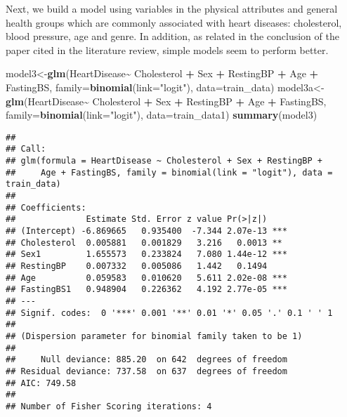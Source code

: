 \documentclass[
]{article}
\newenvironment{Shaded}{\begin{snugshade}}{\end{snugshade}}
\newcommand{\AttributeTok}[1]{\textcolor[rgb]{0.13,0.29,0.53}{#1}}
\newcommand{\FunctionTok}[1]{\textcolor[rgb]{0.13,0.29,0.53}{\textbf{#1}}}
\newcommand{\NormalTok}[1]{#1}
\newcommand{\OtherTok}[1]{\textcolor[rgb]{0.56,0.35,0.01}{#1}}
\newcommand{\SpecialCharTok}[1]{\textcolor[rgb]{0.81,0.36,0.00}{\textbf{#1}}}
\newcommand{\StringTok}[1]{\textcolor[rgb]{0.31,0.60,0.02}{#1}}
\begin{document}
Next, we build a model using variables in the physical attributes and
general health groups which are commonly associated with heart diseases:
cholesterol, blood pressure, age and genre. In addition, as related in
the conclusion of the paper cited in the literature review, simple
models seem to perform better.

\begin{Shaded}
\begin{Highlighting}[]
\NormalTok{model3}\OtherTok{\textless{}{-}}\FunctionTok{glm}\NormalTok{(HeartDisease}\SpecialCharTok{\textasciitilde{}}\NormalTok{ Cholesterol }\SpecialCharTok{+}\NormalTok{ Sex }\SpecialCharTok{+}\NormalTok{ RestingBP }\SpecialCharTok{+} 
\NormalTok{              Age }\SpecialCharTok{+}\NormalTok{ FastingBS, }\AttributeTok{family=}\FunctionTok{binomial}\NormalTok{(}\AttributeTok{link=}\StringTok{"logit"}\NormalTok{), }\AttributeTok{data=}\NormalTok{train\_data)}
\NormalTok{model3a}\OtherTok{\textless{}{-}}\FunctionTok{glm}\NormalTok{(HeartDisease}\SpecialCharTok{\textasciitilde{}}\NormalTok{ Cholesterol }\SpecialCharTok{+}\NormalTok{ Sex }\SpecialCharTok{+}\NormalTok{ RestingBP }\SpecialCharTok{+} 
\NormalTok{               Age }\SpecialCharTok{+}\NormalTok{ FastingBS, }\AttributeTok{family=}\FunctionTok{binomial}\NormalTok{(}\AttributeTok{link=}\StringTok{"logit"}\NormalTok{), }\AttributeTok{data=}\NormalTok{train\_data1)}
\FunctionTok{summary}\NormalTok{(model3)}
\end{Highlighting}
\end{Shaded}

\begin{verbatim}
## 
## Call:
## glm(formula = HeartDisease ~ Cholesterol + Sex + RestingBP + 
##     Age + FastingBS, family = binomial(link = "logit"), data = train_data)
## 
## Coefficients:
##              Estimate Std. Error z value Pr(>|z|)    
## (Intercept) -6.869665   0.935400  -7.344 2.07e-13 ***
## Cholesterol  0.005881   0.001829   3.216   0.0013 ** 
## Sex1         1.655573   0.233824   7.080 1.44e-12 ***
## RestingBP    0.007332   0.005086   1.442   0.1494    
## Age          0.059583   0.010620   5.611 2.02e-08 ***
## FastingBS1   0.948904   0.226362   4.192 2.77e-05 ***
## ---
## Signif. codes:  0 '***' 0.001 '**' 0.01 '*' 0.05 '.' 0.1 ' ' 1
## 
## (Dispersion parameter for binomial family taken to be 1)
## 
##     Null deviance: 885.20  on 642  degrees of freedom
## Residual deviance: 737.58  on 637  degrees of freedom
## AIC: 749.58
## 
## Number of Fisher Scoring iterations: 4
\end{verbatim}
\end{document}
